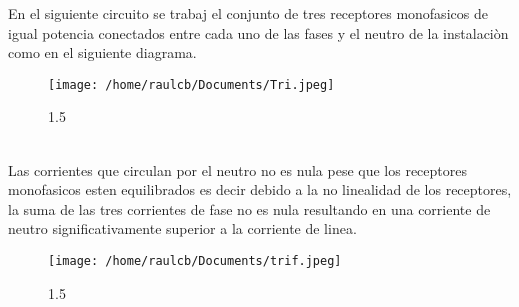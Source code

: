 \documentclass[11pt]{article}
\begin{document}
En el siguiente circuito se trabaj el conjunto de tres receptores monofasicos de igual potencia conectados entre cada uno de las fases y el neutro de la instalaciòn como en el siguiente diagrama. 
\begin{figure}[htp]
\centering
\texttt{[image: /home/raulcb/Documents/Tri.jpeg]}
\caption{1.5}
\label{.}
\end{figure}
\\
Las corrientes que circulan por el neutro no es nula pese que los receptores monofasicos esten equilibrados es decir debido a la no linealidad de los receptores, la suma de las tres corrientes de fase no es nula resultando en una corriente de neutro significativamente superior a la corriente de linea.
\begin{figure}[htp]
\centering
\texttt{[image: /home/raulcb/Documents/trif.jpeg]}
\caption{1.5}
\label{.}
\end{figure}
\end{document}
